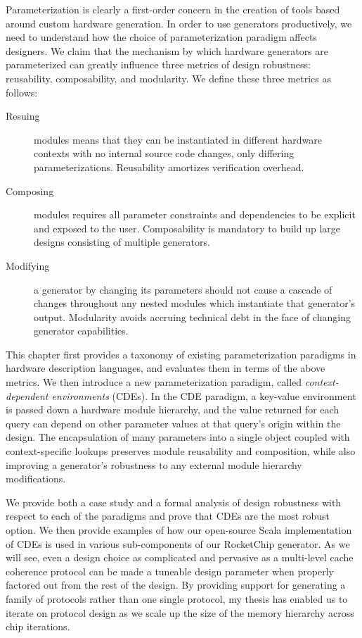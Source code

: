 Parameterization is clearly a first-order concern in the creation of tools based around custom hardware generation.
In order to use generators productively, we need to understand how the choice of parameterization paradigm affects designers.
We claim that the mechanism by which hardware generators are parameterized can greatly influence three metrics of design robustness: reusability, composability, and modularity.
We define these three metrics as follows:
\begin{description}
\item[Resuing] modules means that they can be instantiated in different hardware contexts with no internal source code changes, only differing parameterizations. Reusability amortizes verification overhead.
\item[Composing] modules requires all parameter constraints and dependencies to be explicit and exposed to the user. Composability is mandatory to build up large designs consisting of multiple generators.
\item[Modifying] a generator by changing its parameters should not cause a cascade of changes throughout any nested modules which instantiate that generator's output. Modularity avoids accruing technical debt in the face of changing generator capabilities.
\end{description}

This chapter first provides a taxonomy of existing parameterization paradigms in hardware description languages,
and evaluates them in terms of the above metrics.
We then introduce a new parameterization paradigm, called \emph{context-dependent environments} (CDEs).
In the CDE paradigm, a key-value environment is passed down a hardware module hierarchy, and the value returned for each query can depend on other parameter values at that query's origin within the design.
The encapsulation of many parameters into a single object coupled with context-specific lookups preserves module reusability and composition, while also improving a generator's robustness to any external module hierarchy modifications.

We provide both a case study and a formal analysis of design robustness with respect to each of the paradigms and prove that CDEs are the most robust option.
We then provide examples of how our open-source Scala implementation of CDEs is used in various sub-components of our RocketChip generator.
As we will see, even a design choice as complicated and pervasive as a multi-level cache coherence protocol can be made a tuneable design parameter when properly factored out from the rest of the design. 
By providing support for generating a family of protocols rather than one single protocol, my thesis has enabled us to iterate on protocol design as we scale up the size of the memory hierarchy across chip iterations.

